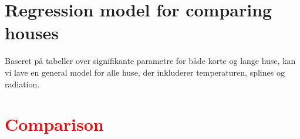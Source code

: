 \section{Regression model for comparing houses}
Baseret på tabeller over signifikante parametre for både korte og lange huse, kan vi lave en general model for alle huse, der inkluderer temperaturen, splines og radiation.

\section{\textcolor{red}{Comparison}}
